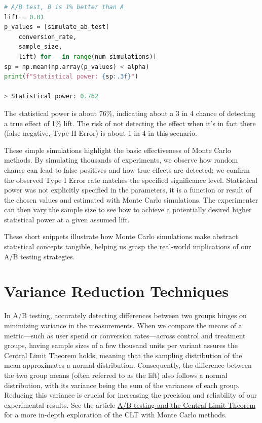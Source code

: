 \documentclass[final,5p,times,twocolumn,authoryear]{elsarticle}
\begin{document}
\begin{minipage}{\linewidth}
\begin{lstlisting}[language=Python, caption=A/B test statistical power computation.]
# A/B test, B is 1% better than A
lift = 0.01
p_values = [simulate_ab_test(
    conversion_rate,
    sample_size,
    lift) for _ in range(num_simulations)]
sp = np.mean(np.array(p_values) < alpha)
print(f"Statistical power: {sp:.3f}")

> Statistical power: 0.762
\end{lstlisting}
\end{minipage}

The statistical power is about 76\%, indicating about a 3 in 4 chance of detecting a true effect of 1\% lift. The risk of not detecting the effect when it's in fact there (false negative, Type II Error) is about 1 in 4 in this scenario.

These simple simulations highlight the basic effectiveness of Monte Carlo methods. By simulating thousands of experiments, we observe how random chance can lead to false positives and how true effects are detected; we confirm the observed Type I Error rate matches the specified significance level. Statistical power was not explicitly specified in the parameters, it is a function or result of the chosen values and estimated with Monte Carlo simulations. The experimenter can then vary the sample size to see how to achieve a potentially desired higher statistical power at a given assumed lift.

These short snippets illustrate how Monte Carlo simulations make abstract statistical concepts tangible, helping us grasp the real-world implications of our A/B testing strategies.

\section{Variance Reduction Techniques}

In A/B testing, accurately detecting differences between two groups hinges on minimizing variance in the measurements. When we compare the means of a metric—such as user spend or conversion rates—across control and treatment groups, having sample sizes of a few thousand units per variant assures the Central Limit Theorem holds, meaning that the sampling distribution of the mean approximates a normal distribution. Consequently, the difference between the two group means (often referred to as the lift) also follows a normal distribution, with its variance being the sum of the variances of each group. Reducing this variance is crucial for increasing the precision and reliability of our experimental results. See the article \href{https://bytepawn.com/ab-testing-and-the-central-limit-theorem.html}{A/B testing and the Central Limit Theorem} for a more in-depth exploration of the CLT with Monte Carlo methods.
\end{document}

